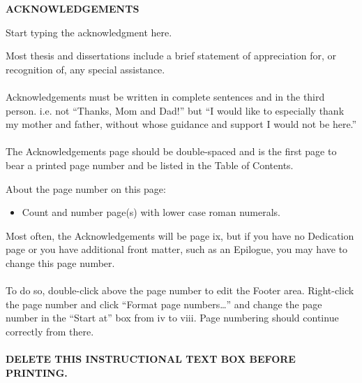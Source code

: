 \documentclass[a4paper,12pt,one side]{report}
\theoremstyle{definition}
\begin{document}
\NoBgThispage
\newpage

\begin{center}
     \bf {ACKNOWLEDGEMENTS} 
\end{center}
Start typing the acknowledgment here. 

\begin{tcolorbox}[enhanced jigsaw,
    sharp corners,
    boxrule=0.5pt, 
    colback=blue!30!white,   
    borderline={0.5pt}{-2pt}{black,solid} %
 ]
 \begin{justify}
 Most thesis and dissertations include a brief statement of appreciation for, or recognition of, any special assistance.\\~\\
Acknowledgements must be written in complete sentences and in the third person. i.e. not “Thanks, Mom and Dad!” but “I would like to especially thank my mother and father, without whose guidance and support I would not be here.”\\~\\
The Acknowledgements page should be double-spaced and is the first page to bear a printed page number and be listed in the Table of Contents.
\end{justify}
\end{tcolorbox}


\begin{tcolorbox}[enhanced jigsaw,
    sharp corners,
    boxrule=0.5pt, 
    colback=blue!30!white,   
    borderline={0.5pt}{-2pt}{black,solid} %
 ]
 \begin{justify}
 About the page number on this page:
\begin{itemize}
    \item Count and number page(s) with lower case roman numerals.
\end{itemize}
Most often, the Acknowledgements will be page ix, but if you have no Dedication page or you have additional front matter, such as an Epilogue, you may have to change this page number.
\\~\\
To do so, double-click above the page number to edit the Footer area.  Right-click the page number and click “Format page numbers…” and change the page number in the “Start at” box from iv to viii.  Page numbering should continue correctly from there.
\\~\\
{\bf DELETE THIS INSTRUCTIONAL TEXT BOX BEFORE PRINTING.}
\end{justify}
\end{tcolorbox}
\end{document}
